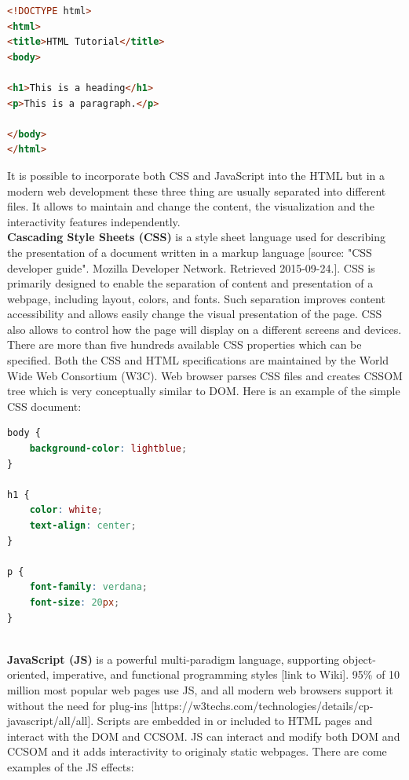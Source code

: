 \begin{lstlisting}[language=html]
<!DOCTYPE html>
<html>
<title>HTML Tutorial</title>
<body>

<h1>This is a heading</h1>
<p>This is a paragraph.</p>

</body>
</html>
\end{lstlisting}

It is possible to incorporate both CSS and JavaScript into the HTML but in a modern web development these three thing are usually separated into different files. It allows to maintain and change the content, the visualization and the interactivity features independently.\\

\noindent\textbf{Cascading Style Sheets (CSS)} is a style sheet language used for describing the presentation of a document written in a markup language [source: "CSS developer guide". Mozilla Developer Network. Retrieved 2015-09-24.]. CSS is primarily designed to enable the separation of content and presentation of a webpage, including layout, colors, and fonts. Such separation improves content accessibility and allows easily change the visual presentation of the page. CSS also allows to control how the page will display on a different screens and devices. There are more than five hundreds available CSS properties which can be specified. Both the CSS and HTML specifications are maintained by the World Wide Web Consortium (W3C). Web browser parses CSS files and creates CSSOM tree which is very conceptually similar to DOM. Here is an example of the simple CSS document: \\

\begin{lstlisting}[language=css]
body {
    background-color: lightblue;
}

h1 {
    color: white;
    text-align: center;
}

p {
    font-family: verdana;
    font-size: 20px;
}
\end{lstlisting}\\

\noindent\textbf{JavaScript (JS)} is a powerful multi-paradigm language, supporting object-oriented, imperative, and functional programming styles [link to Wiki]. 95\% of 10 million most popular web pages use JS, and all modern web browsers support it without the need for plug-ins [https://w3techs.com/technologies/details/cp-javascript/all/all]. Scripts are embedded in or included to HTML pages and interact with the DOM and CCSOM. JS can interact and modify both DOM and CCSOM and it adds interactivity to originaly static webpages. There are come examples of the JS effects:

